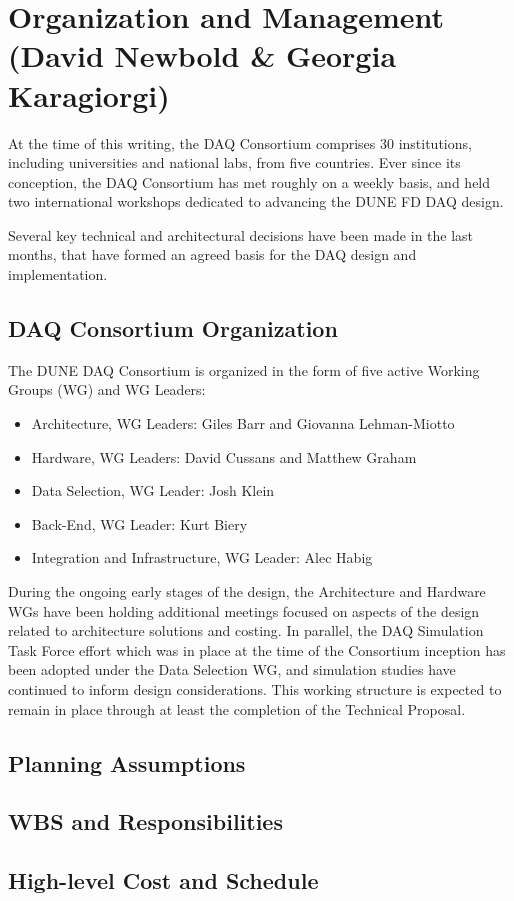 
\section{Organization and Management (David Newbold \& Georgia Karagiorgi)}
\label{sec:fdsp-daq-org}

At the time of this writing, the DAQ Consortium comprises 30
institutions, including universities and national labs, from five
countries. Ever since its conception, the DAQ Consortium has met 
roughly on a weekly basis, and held two international workshops
dedicated to advancing the DUNE FD DAQ design.

Several key technical and architectural decisions have been made in
the last months, that have formed an agreed basis for the DAQ design
and implementation.  

\subsection{DAQ Consortium Organization}
\label{sec:fdsp-daq-org-consortium}

The DUNE DAQ Consortium is organized in the form of five active
Working Groups (WG) and WG Leaders:
\begin{itemize}
\item Architecture, WG Leaders: Giles Barr and Giovanna Lehman-Miotto 
\item Hardware, WG Leaders: David Cussans and Matthew Graham
\item Data Selection, WG Leader: Josh Klein
\item Back-End, WG Leader: Kurt Biery
\item Integration and Infrastructure, WG Leader: Alec Habig
\end{itemize}

During the ongoing early stages of the design, the Architecture and
Hardware WGs have been holding additional meetings focused on aspects
of the design related to architecture solutions and costing. In
parallel, the DAQ Simulation Task Force effort which was in place at
the time of the Consortium inception has been adopted under the Data
Selection WG, and simulation studies have continued to inform design considerations. 
This working structure is expected to remain in place through at least
the completion of the Technical Proposal.

\subsection{Planning Assumptions}
\label{sec:fdsp-daq-org-assmp}


\subsection{WBS and Responsibilities}
\label{sec:fdsp-daq-org-wbs}

\subsection{High-level Cost and Schedule}
\label{sec:fdsp-daq-org-cs}

